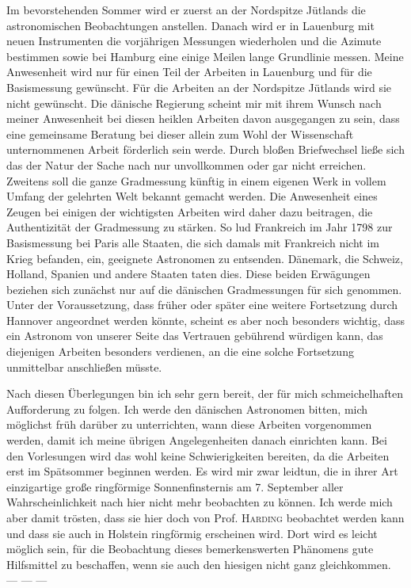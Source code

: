 \par{}%
Im bevorstehenden Sommer wird er zuerst an der Nordspitze Jütlands die astronomischen Beobachtungen anstellen. Danach wird er in Lauenburg mit neuen Instrumenten die vorjährigen Messungen wiederholen und die Azimute bestimmen sowie bei Hamburg eine einige Meilen lange Grundlinie messen. Meine Anwesenheit wird nur für einen Teil der Arbeiten in Lauenburg und für die Basismessung gewünscht. Für die Arbeiten an der Nordspitze Jütlands wird sie nicht gewünscht. Die dänische Regierung scheint mir mit ihrem Wunsch nach meiner Anwesenheit bei diesen heiklen Arbeiten davon ausgegangen zu sein, dass eine gemeinsame Beratung bei dieser allein zum Wohl der Wissenschaft unternommenen Arbeit förderlich sein werde. Durch bloßen Briefwechsel ließe sich das der Natur der Sache nach nur unvollkommen oder gar nicht erreichen. Zweitens soll die ganze Gradmessung künftig in einem eigenen Werk in vollem Umfang der gelehrten Welt bekannt gemacht werden. Die Anwesenheit eines Zeugen bei einigen der wichtigsten Arbeiten wird daher dazu beitragen, die Authentizität der Gradmessung zu stärken. So lud Frankreich im Jahr 1798 zur Basismessung bei Paris alle Staaten, die sich damals mit Frankreich nicht im Krieg befanden, ein, geeignete Astronomen zu entsenden. Dänemark, die Schweiz, Holland, Spanien und andere Staaten taten dies. Diese beiden Erwägungen beziehen sich zunächst nur auf die dänischen Gradmessungen für sich genommen. Unter der Voraussetzung, dass früher oder später eine weitere Fortsetzung durch Hannover angeordnet werden könnte, scheint es aber noch besonders wichtig, dass ein Astronom von unserer Seite das Vertrauen gebührend würdigen kann, das diejenigen Arbeiten besonders verdienen, an die eine solche Fortsetzung unmittelbar anschließen müsste.

Nach diesen Überlegungen bin ich sehr gern bereit, der für mich schmeichelhaften Aufforderung zu folgen. Ich werde den dänischen Astronomen bitten, mich möglichst früh darüber zu unterrichten, wann diese Arbeiten vorgenommen werden, damit ich meine übrigen Angelegenheiten danach einrichten kann. Bei den Vorlesungen wird das wohl keine Schwierigkeiten bereiten, da die Arbeiten erst im Spätsommer beginnen werden. Es wird mir zwar leidtun, die in ihrer Art einzigartige große ringförmige Sonnenfinsternis am 7. September aller Wahrscheinlichkeit nach hier nicht mehr beobachten zu können. Ich werde mich aber damit trösten, dass sie hier doch von Prof. \textsc{Harding} beobachtet werden kann und dass sie auch in Holstein ringförmig erscheinen wird. Dort wird es leicht möglich sein, für die Beobachtung dieses bemerkenswerten Phänomens gute Hilfsmittel zu beschaffen, wenn sie auch den hiesigen nicht ganz gleichkommen. — — —

